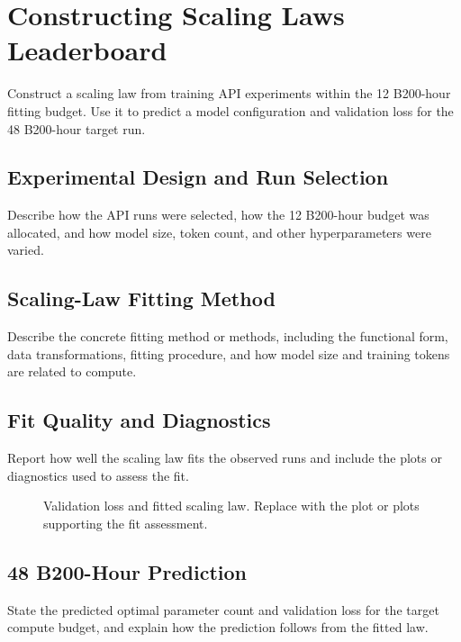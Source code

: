 \section{Constructing Scaling Laws Leaderboard}
\label{sec:scaling-laws}


Construct a scaling law from training API experiments within the 12 B200-hour fitting budget. Use it to predict a model configuration and validation loss for the 48 B200-hour target run.

\subsection{Experimental Design and Run Selection}
Describe how the API runs were selected, how the 12 B200-hour budget was allocated, and how model size, token count, and other hyperparameters were varied.
\answer

\subsection{Scaling-Law Fitting Method}
Describe the concrete fitting method or methods, including the functional form, data transformations, fitting procedure, and how model size and training tokens are related to compute.
\answer

\subsection{Fit Quality and Diagnostics}
Report how well the scaling law fits the observed runs and include the plots or diagnostics used to assess the fit.
\begin{figure}[htbp]
\centering
{}
\caption{Validation loss and fitted scaling law. Replace with the plot or plots supporting the fit assessment.}
\label{fig:scaling-law-fit}
\end{figure}
\answer

\subsection{48 B200-Hour Prediction}
State the predicted optimal parameter count and validation loss for the target compute budget, and explain how the prediction follows from the fitted law.
\answer

